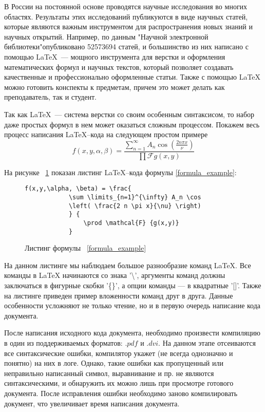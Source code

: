 \introduction %

В России на постоянной основе проводятся научные исследования во многих областях. Результаты этих исследований публикуются в виде научных статей, которые являются важным инструментом для распространения новых знаний и научных открытий.
Например, по данным "Научной электронной библиотеки"\;опубликовано 52573694 \cite{eLib} статей, и большинство из них написано с помощью \LaTeX ~--- мощного инструмента для верстки и оформления математических формул и научных текстов, который позволяет создавать качественные и профессионально оформленные статьи. 
Также с помощью \LaTeX\; можно готовить конспекты к предметам, причем это может делать как преподаватель, так и студент.

Так как \LaTeX ~--- система верстки со своим особенным синтаксисом, то набор даже простых формул в нем может оказаться сложным процессом. Покажем весь процесс написания \LaTeX--кода на следующем простом примере
\begin{equation}
    \label{formula_example}
        f(x,y,\alpha, \beta) = \frac{\sum \limits_{n=1}^{\infty} 
        A_n \cos \left( \frac{2 n \pi x}{\nu} \right)} {\prod \mathcal{F} {g(x,y)} } 
\end{equation}

На рисунке ~\ref{formula_listing} показан листинг \LaTeX--кода формулы \ref{formula_example}:

\begin{figure}
    \begin{lstlisting}[language={[LaTeX]Tex}]
        f(x,y,\alpha, \beta) = \frac{
            \sum \limits_{n=1}^{\infty} A_n \cos 
            \left( \frac{2 n \pi x}{\nu} \right)
            } {
                \prod \mathcal{F} {g(x,y)} 
            } 
    \end{lstlisting}
    \caption{Листинг формулы ~\ref{formula_example}}
    \label{formula_listing}
\end{figure}

На данном листинге мы наблюдаем большое разнообразие команд \LaTeX. 
Все команды в \LaTeX\; начинаются со знака '\textbackslash', аргументы команд должны заключаться в фигурные скобки '\{\}',
а опции команды --- в квадратные '[]'. Также на листинге приведен пример вложенности команд друг в друга. 
Данные особенности усложняют не только чтение, но и в первую очередь написание кода документа.

После написания исходного кода документа, необходимо произвести компиляцию в один из поддерживаемых форматов: $\textit{.pdf}$ и $\textit{.dvi}$. 
На данном этапе отсеиваются все синтаксические ошибки, компилятор укажет (не всегда однозначно и понятно) на них в логе. 
Однако, такие ошибки как пропущенный или неправильно написанный символ, выравнивание и пр. не являются синтаксическими, и обнаружить их можно лишь при просмотре готового документа. 
После исправления ошибки необходимо заново компилировать документ, что увеличивает время написания документа.


